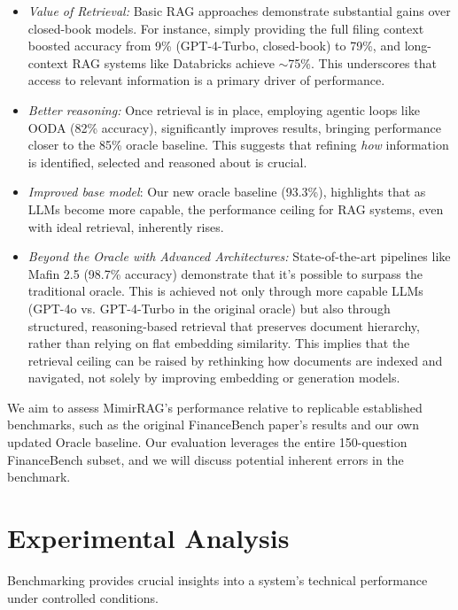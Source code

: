 \documentclass[final,5p,times,twopage,twocolumn,a4paper]{elsarticle}
\begin{document}
\begin{itemize}
    \item \textit{Value of Retrieval:} Basic RAG approaches demonstrate substantial gains over closed-book models. For instance, simply providing the full filing context boosted accuracy from 9\% (GPT-4-Turbo, closed-book) to 79\%, and long-context RAG systems like Databricks achieve $\sim$75\%. This underscores that access to relevant information is a primary driver of performance.
    \item \textit{Better reasoning:} Once retrieval is in place, employing agentic loops like OODA (82\% accuracy), significantly improves results, bringing performance closer to the 85\% oracle baseline. This suggests that refining \textit{how} information is identified, selected and reasoned about is crucial.
    \item \textit{Improved base model}: Our new oracle baseline (93.3\%), highlights that as LLMs become more capable, the performance ceiling for RAG systems, even with ideal retrieval, inherently rises.
    \item \textit{Beyond the Oracle with Advanced Architectures:} State-of-the-art pipelines like Mafin 2.5 (98.7\% accuracy) demonstrate that it's possible to surpass the traditional oracle. This is achieved not only through more capable LLMs (GPT-4o vs. GPT-4-Turbo in the original oracle) but also through structured, reasoning-based retrieval that preserves document hierarchy, rather than relying on flat embedding similarity. This implies that the retrieval ceiling can be raised by rethinking how documents are indexed and navigated, not solely by improving embedding or generation models.
\end{itemize}
%
We aim to assess MimirRAG's performance relative to replicable established benchmarks, such as the original FinanceBench paper's results and our own updated Oracle baseline. Our evaluation leverages the entire 150-question FinanceBench subset, and we will discuss potential inherent errors in the benchmark.


\section{Experimental Analysis}
Benchmarking provides crucial insights into a system's technical performance under controlled conditions.
\end{document}
